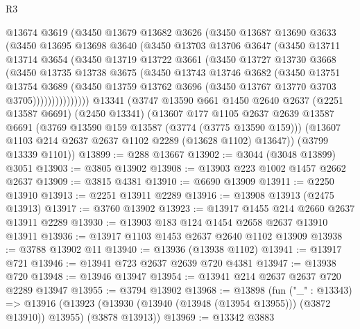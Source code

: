\begin{lexlean}{R3}
\begin{coremodule}
          @13674
          @3619
          (@3450
            @13679
            @13682
            @3626
            (@3450
              @13687
              @13690
              @3633
              (@3450
                @13695
                @13698
                @3640
                (@3450
                  @13703
                  @13706
                  @3647
                  (@3450
                    @13711
                    @13714
                    @3654
                    (@3450
                      @13719
                      @13722
                      @3661
                      (@3450
                        @13727
                        @13730
                        @3668
                        (@3450
                          @13735
                          @13738
                          @3675
                          (@3450
                            @13743
                            @13746
                            @3682
                            (@3450
                              @13751
                              @13754
                              @3689
                              (@3450
                                @13759
                                @13762
                                @3696
                                (@3450 @13767 @13770 @3703 @3705)))))))))))))))
    @13341
    (@3747
      @13590
      @661
      @1450
      @2640
      @2637
      (@2251 @13587 @6691)
      (@2450 @13341)
      (@13607
        @177
        @1105
        @2637
        @2639
        @13587
        @6691
        (@3769 @13590 @159 @13587 (@3774 (@3775 @13590 @159)))
        (@13607 @1103 @214 @2637 @2637 @1102 @2289 (@13628 @1102) @13647))
      (@3799 @13339 @1101))
@13899 := @288 @13667
@13902 := @3044 (@3048 @13899) @3051
@13903 := @3805 @13902
@13908 := @13903 @223 @1002 @1457 @2662 @2637
@13909 := @3815 @4381
@13910 := @6690 @13909
@13911 := @2250 @13910
@13913 := @2251 @13911 @2289
@13916 := @13908 @13913 (@2475 @13913)
@13917 := @3760 @13902
@13923 := @13917 @1455 @214 @2660 @2637 @13911 @2289
@13930 := @13903 @183 @124 @1454 @2658 @2637 @13910 @13911
@13936 := @13917 @1103 @1453 @2637 @2640 @1102 @13909
@13938 := @3788 @13902 @11
@13940 := @13936 (@13938 @1102)
@13941 := @13917 @721
@13946 := @13941 @723 @2637 @2639 @720 @4381
@13947 := @13938 @720
@13948 := @13946 @13947
@13954 := @13941 @214 @2637 @2637 @720 @2289 @13947
@13955 := @3794 @13902
@13968 := @13898
    (fun ("_" : @13343) =>
    @13916 (@13923 (@13930 (@13940 (@13948 (@13954 @13955))) (@3872 @13910)) @13955) (@3878 @13913))
@13969 := @13342 @3883

\end{coremodule}
\end{lexlean}
